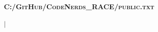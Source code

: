 \documentclass[letterpaper,11pt]{article}
\begin{document}
\begin{center}
    \textbf{\Huge \scshape C:/GitHub/CodeNerds_RACE/public\textbackslashoutput\textbackslashresume.txt} \\ \vspace{1pt}
    \small  \\ \vspace{2pt}
    \small \href{mailto:}{\underline{}} $|$ 
    \href{tel:}{\underline{}}
\end{center}
\end{document}
